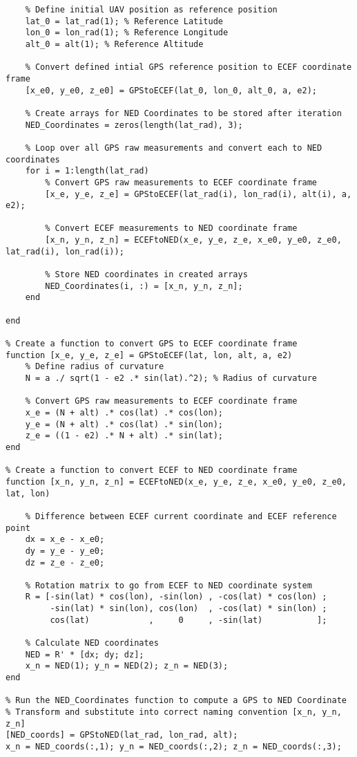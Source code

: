 \begin{lstlisting}
    % Define initial UAV position as reference position
    lat_0 = lat_rad(1); % Reference Latitude
    lon_0 = lon_rad(1); % Reference Longitude
    alt_0 = alt(1); % Reference Altitude

    % Convert defined intial GPS reference position to ECEF coordinate frame
    [x_e0, y_e0, z_e0] = GPStoECEF(lat_0, lon_0, alt_0, a, e2);

    % Create arrays for NED Coordinates to be stored after iteration
    NED_Coordinates = zeros(length(lat_rad), 3);

    % Loop over all GPS raw measurements and convert each to NED coordinates
    for i = 1:length(lat_rad)
        % Convert GPS raw measurements to ECEF coordinate frame
        [x_e, y_e, z_e] = GPStoECEF(lat_rad(i), lon_rad(i), alt(i), a, e2);
        
        % Convert ECEF measurements to NED coordinate frame
        [x_n, y_n, z_n] = ECEFtoNED(x_e, y_e, z_e, x_e0, y_e0, z_e0, lat_rad(i), lon_rad(i));

        % Store NED coordinates in created arrays
        NED_Coordinates(i, :) = [x_n, y_n, z_n];
    end

end

% Create a function to convert GPS to ECEF coordinate frame
function [x_e, y_e, z_e] = GPStoECEF(lat, lon, alt, a, e2)
    % Define radius of curvature
    N = a ./ sqrt(1 - e2 .* sin(lat).^2); % Radius of curvature

    % Convert GPS raw measurements to ECEF coordinate frame
    x_e = (N + alt) .* cos(lat) .* cos(lon);
    y_e = (N + alt) .* cos(lat) .* sin(lon);
    z_e = ((1 - e2) .* N + alt) .* sin(lat);
end

% Create a function to convert ECEF to NED coordinate frame
function [x_n, y_n, z_n] = ECEFtoNED(x_e, y_e, z_e, x_e0, y_e0, z_e0, lat, lon)
    
    % Difference between ECEF current coordinate and ECEF reference point
    dx = x_e - x_e0;
    dy = y_e - y_e0;
    dz = z_e - z_e0;

    % Rotation matrix to go from ECEF to NED coordinate system
    R = [-sin(lat) * cos(lon), -sin(lon) , -cos(lat) * cos(lon) ;
         -sin(lat) * sin(lon), cos(lon)  , -cos(lat) * sin(lon) ;
         cos(lat)            ,     0     , -sin(lat)           ];
    
    % Calculate NED coordinates
    NED = R' * [dx; dy; dz];
    x_n = NED(1); y_n = NED(2); z_n = NED(3);
end

% Run the NED_Coordinates function to compute a GPS to NED Coordinate
% Transform and substitute into correct naming convention [x_n, y_n, z_n]
[NED_coords] = GPStoNED(lat_rad, lon_rad, alt);
x_n = NED_coords(:,1); y_n = NED_coords(:,2); z_n = NED_coords(:,3);


\end{lstlisting}
